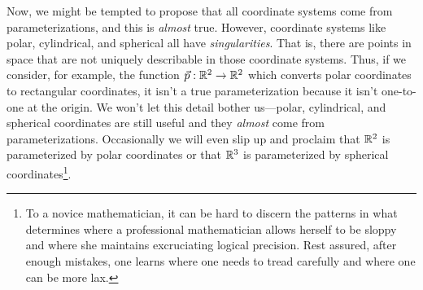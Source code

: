 Now, we might be tempted to propose that all coordinate systems come from parameterizations,
and this is \emph{almost} true.  However, coordinate systems like polar, cylindrical, and spherical
all have \emph{singularities}.  That is, there are points in space that are not uniquely
describable in those coordinate systems.  Thus, if we consider, for example, the function
$\vec p:\mathbb{R}^2\to\mathbb{R}^2$ which converts polar coordinates to rectangular coordinates, it isn't a true
parameterization because it isn't one-to-one at the origin.  We won't let this detail bother us---polar,
cylindrical, and spherical coordinates are still useful and they \emph{almost} come from parameterizations.
Occasionally we will even slip up and proclaim that $\mathbb{R}^2$ is parameterized by polar coordinates
or that $\mathbb{R}^3$ is parameterized by spherical coordinates\footnote{
	To a novice mathematician, it can be hard to discern the 
	patterns in what determines where a professional mathematician allows
	herself to be sloppy and where she maintains excruciating logical precision.
	Rest assured, after enough mistakes, one learns where one needs to tread carefully
	and where one can be more lax.
}.


\begin{exercises}
\end{exercises}
